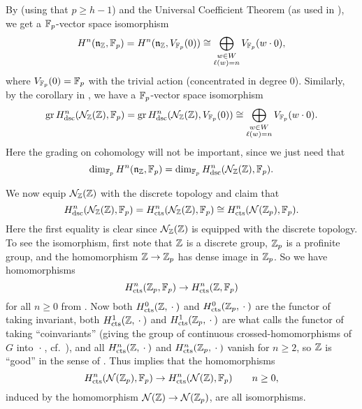By \cite[§2.10]{PT} (using that $p \geq h-1$) and the Universal Coefficient Theorem (as used in \cite[§3.8]{PT}), we get a $\mathbb{F}_{p}$-vector space isomorphism
\begin{equation*}
  H^{n}(\mathfrak{n}_{\mathbb{Z}},\mathbb{F}_{p}) = H^{n}(\mathfrak{n}_{\mathbb{Z}},V_{\mathbb{F}_p}(0)) \cong \bigoplus_{\substack{w \in W \\ \ell(w) = n}} V_{\mathbb{F}_p}(w \cdot 0),
\end{equation*}
where $V_{\mathbb{F}_{p}}(0) = \mathbb{F}_{p}$ with the trivial action (concentrated in degree $0$). Similarly, by the corollary in \cite[§3.8]{PT}, we have a $\mathbb{F}_{p}$-vector space isomorphism
\begin{equation*}
  \operatorname{gr} H_{\mathrm{dsc}}^{n}(\mathcal{N}_{\mathbb{Z}}(\mathbb{Z}),\mathbb{F}_{p}) = \operatorname{gr} H_{\mathrm{dsc}}^{n}(\mathcal{N}_{\mathbb{Z}}(\mathbb{Z}),V_{\mathbb{F}_p}(0)) \cong \bigoplus_{\substack{w \in W \\ \ell(w) = n}} V_{\mathbb{F}_p}(w \cdot 0).
\end{equation*}
Here the grading on cohomology will not be important, since we just need that
\begin{equation}
  \label{eq:PT-dims}
  \dim_{\mathbb{F}_{p}} H^{n}(\mathfrak{n}_{\mathbb{Z}},\mathbb{F}_{p}) = \dim_{\mathbb{F}_{p}} H_{\mathrm{dsc}}^{n}(\mathcal{N}_{\mathbb{Z}}(\mathbb{Z}),\mathbb{F}_{p}).
\end{equation}

We now equip $\mathcal{N}_{\mathbb{Z}}(\mathbb{Z})$ with the discrete topology and claim that
\begin{equation*}
  H_{\mathrm{dsc}}^{n}(\mathcal{N}_{\mathbb{Z}}(\mathbb{Z}),\mathbb{F}_{p}) = H_{\mathrm{cts}}^{n}(\mathcal{N}_{\mathbb{Z}}(\mathbb{Z}),\mathbb{F}_{p}) \cong H_{\mathrm{cts}}^{n}(\mathcal{N}(\mathbb{Z}_p),\mathbb{F}_{p}).
\end{equation*}
Here the first equality is clear since $\mathcal{N}_{\mathbb{Z}}(\mathbb{Z})$ is equipped with the discrete topology. To see the isomorphism, first note that $\mathbb{Z}$ is a discrete group, $\mathbb{Z}_p$ is a profinite group, and the homomorphism $\mathbb{Z} \to \mathbb{Z}_p$ has dense image in $\mathbb{Z}_p$. So we have homomorphisms
\begin{equation*}
  H_{\mathrm{cts}}^n(\mathbb{Z}_p,\mathbb{F}_p) \to H_{\mathrm{cts}}^n(\mathbb{Z},\mathbb{F}_p)
\end{equation*}
for all $n\geq0$ from \cite[Sect.~I~§2.6]{GalCoh}. Now both $H_{\mathrm{cts}}^0(\mathbb{Z},\:\cdot\:)$ and $H_{\mathrm{cts}}^0(\mathbb{Z}_p,\:\cdot\:)$ are the functor of taking invariant, both $H_{\mathrm{cts}}^1(\mathbb{Z},\:\cdot\:)$ and $H_{\mathrm{cts}}^1(\mathbb{Z}_p,\:\cdot\:)$ are what \cite{GK} calls the functor of taking ``coinvariants'' (giving the group of continuous crossed-homomorphisms of $G$ into $\:\cdot\:$, cf.\ \cite[I.~§2]{GalCoh}), and all $H_{\mathrm{cts}}^n(\mathbb{Z},\:\cdot\:)$ and $H_{\mathrm{cts}}^n(\mathbb{Z}_p,\:\cdot\:)$ vanish for $n\geq2$, so $\mathbb{Z}$ is \enquote{good} in the sense of \cite[Section~I~§2.6 Exercise~2]{GalCoh}. Thus \cite[Section~I~§2.6 Exercise~2(d)]{GalCoh} implies that the homomorphisms
\begin{equation*}
  H_{\mathrm{cts}}^n(\mathcal{N}(\mathbb{Z}_p),\mathbb{F}_p) \to H_{\mathrm{cts}}^n(\mathcal{N}(\mathbb{Z}),\mathbb{F}_p) \qquad n\geq0,
\end{equation*}
induced by the homomorphism $\mathcal{N}(\mathbb{Z}) \to \mathcal{N}(\mathbb{Z}_p)$, are all isomorphisms.

